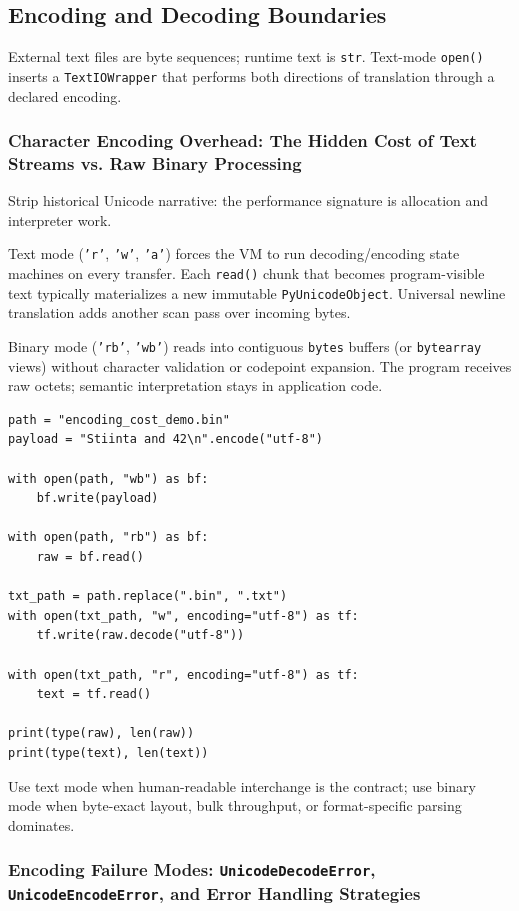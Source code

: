 \subsection{Encoding and Decoding Boundaries}

External text files are byte sequences; runtime text is \texttt{str}. Text-mode \texttt{open()} inserts a \texttt{TextIOWrapper} that performs both directions of translation through a declared encoding.

\subsubsection{Character Encoding Overhead: The Hidden Cost of Text Streams vs. Raw Binary Processing}

Strip historical Unicode narrative: the performance signature is allocation and interpreter work.

Text mode (\texttt{'r'}, \texttt{'w'}, \texttt{'a'}) forces the VM to run decoding/encoding state machines on every transfer. Each \texttt{read()} chunk that becomes program-visible text typically materializes a new immutable \texttt{PyUnicodeObject}. Universal newline translation adds another scan pass over incoming bytes.

Binary mode (\texttt{'rb'}, \texttt{'wb'}) reads into contiguous \texttt{bytes} buffers (or \texttt{bytearray} views) without character validation or codepoint expansion. The program receives raw octets; semantic interpretation stays in application code.

\begin{verbatim}
path = "encoding_cost_demo.bin"
payload = "Stiinta and 42\n".encode("utf-8")

with open(path, "wb") as bf:
    bf.write(payload)

with open(path, "rb") as bf:
    raw = bf.read()

txt_path = path.replace(".bin", ".txt")
with open(txt_path, "w", encoding="utf-8") as tf:
    tf.write(raw.decode("utf-8"))

with open(txt_path, "r", encoding="utf-8") as tf:
    text = tf.read()

print(type(raw), len(raw))
print(type(text), len(text))
\end{verbatim}

Use text mode when human-readable interchange is the contract; use binary mode when byte-exact layout, bulk throughput, or format-specific parsing dominates.

\subsubsection{Encoding Failure Modes: \texttt{UnicodeDecodeError}, \texttt{UnicodeEncodeError}, and Error Handling Strategies}

